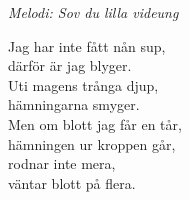 {\footnotesize\textit{Melodi: Sov du lilla videung}}\par
\vspace{10pt}
Jag har inte fått nån sup,\\
därför är jag blyger.\\
Uti magens trånga djup,\\
hämningarna smyger.\\
Men om blott jag får en tår,\\
hämningen ur kroppen går,\\
rodnar inte mera,\\
väntar blott på flera.
